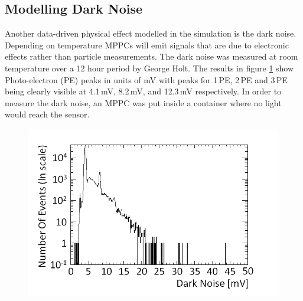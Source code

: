 \subsection{Modelling Dark Noise}\label{sec:GEANT4Simulation_ModellingDarkNoise}
Another data-driven physical effect modelled in the simulation is the dark noise. Depending on temperature MPPCs will emit signals that are due to electronic effects rather than particle measurements. The dark noise was measured at room temperature over a 12 hour period by George Holt. The results in figure \ref{fig:pureDarkNoise} show Photo-electron (PE) peaks in units of mV with peaks for 1\,PE, 2\,PE and 3\,PE being clearly visible at 4.1\,mV, 8.2\,mV, and 12.3\,mV respectively. In order to measure the dark noise, an MPPC was put inside a container where no light would reach the sensor. 
\begin{figure}[!h]
 \centering
 \includegraphics[width=0.7\linewidth]{Chapter4/Figs/Raster/pureDarkNoise_outputMedText.png}
 \label{fig:pureDarkNoise}
\end{figure}

